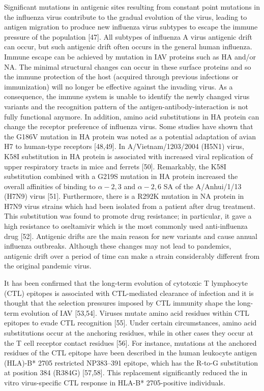 \documentclass[onecolumn, compsoc,10pt]{IEEEtran}
\begin{document}
{  Significant mutations in antigenic sites resulting from constant point mutations in the influenza virus contribute to the gradual evolution of the virus, leading to antigen migration to produce new influenza virus subtypes to escape the immune pressure of the population [47]. All subtypes of influenza A virus antigenic drift can occur, but such antigenic drift often occurs in the general human influenza. Immune escape can be achieved by mutation in IAV proteins such as HA and/or NA. The minimal structural changes can occur in these surface proteins and so the immune protection of the host (acquired through previous infections or immunization) will no longer be effective against the invading virus. As a consequence, the immune system is unable to identify the newly changed virus variants and the recognition pattern of the antigen-antibody-interaction is not fully functional anymore. In addition, amino acid substitutions in HA protein can change the receptor preference of influenza virus. Some studies have shown that the G186V mutation in HA protein was noted as a potential adaptation of avian H7 to human-type receptors [48,49]. In A/Vietnam/1203/2004 (H5N1) virus, K58I substitution in HA protein is associated with increased viral replication of upper respiratory tracts in mice and ferrets [50]. Remarkably, the K58I substitution combined with a G219S mutation in HA protein increased the overall affinities of binding to  $\alpha-2,3$ and  $\alpha-2,6$ SA of the A/Anhui/1/13 (H7N9) virus [51]. Furthermore, there is a R292K mutation in NA protein in H7N9 virus strains which had been isolated from a patient after drug treatment. This substitution was found to promote drug resistance; in particular, it gave a high resistance to oseltamivir which is the most commonly used anti-influenza drug [52]. Antigenic drifts are the main reason for new variants and cause annual influenza outbreaks. Although these changes may not lead to pandemics, antigenic drift over a period of time can make a strain considerably different from the original pandemic virus.

  It has been confirmed that the long-term evolution of cytotoxic T lymphocyte (CTL) epitopes is associated with CTL-mediated clearance of infection and it is thought that the selection pressures imposed by CTL immunity shape the long-term evolution of IAV [53,54]. Viruses mutate amino acid residues within CTL epitopes to evade CTL recognition [55]. Under certain circumstances, amino acid substitutions occur at the anchoring residues, while in other cases they occur at the T cell receptor contact residues [56]. For instance, mutations at the anchored residues of the CTL epitope have been described in the human leukocyte antigen (HLA)-B* 2705 restricted NP383–391 epitope, which has the R-to-G substitution at position 384 (R384G) [57,58]. This replacement significantly reduced the in vitro virus-specific CTL response in HLA-B* 2705-positive individuals.

}
\end{document}
